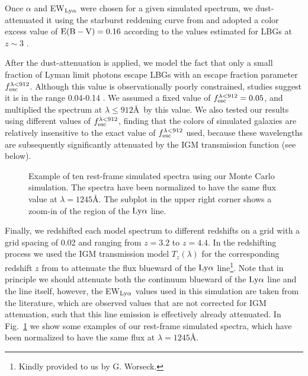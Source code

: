 \documentclass[iop, revtex4]{emulateapj}
\begin{document}
Once $\alpha$ and EW$_{\rm Ly\alpha}$ were chosen for a given
simulated spectrum, we dust-attenuated it using the starburst
reddening curve from \citet{Calzetti00} and adopted a color excess
value of $\rm E(B-V)=0.16$ according to the values estimated for LBGs
at $z\sim3$ \citep{Shapley03}.

After the dust-attenuation is applied, we model the fact that only a
small fraction of Lyman limit photons escape LBGs with an escape
fraction parameter $f_{\rm esc}^{\lambda<912}$. Although this value is
observationally poorly constrained, studies suggest it is in the range
0.04-0.14 \citep{Fernandez03, Shapley06, Ouchi04a}. We assumed a fixed
value of $f_{\rm esc}^{\lambda<912} = 0.05$, and multiplied the
spectrum at $\lambda\leq 912$\AA\, by this value. We also tested our
results using different values of $f_{\rm esc}^{\lambda<912}$, finding
that the colors of simulated galaxies are relatively insensitive to
the exact value of $f_{\rm esc}^{\lambda<912}$ used, because these wavelengths
are subsequently significantly attenuated by the IGM transmission
function (see below).

\begin{figure}
\caption{Example of ten rest-frame simulated spectra using our Monte Carlo simulation. The spectra have been normalized to have the same flux value at $\lambda=1245$\AA. The subplot in the upper right corner shows a zoom-in of the region of the ${\rm Ly\alpha}$ line.\\} 
\label{fig:simulated_spec}
\end{figure}

Finally, we redshifted 
each model spectrum to different redshifts on a grid with a grid spacing
of 0.02 and ranging from $z=3.2$ to $z=4.4$. In the redshifting process we used the
IGM transmission model $T_{z}(\lambda)$ for the corresponding redshift
$z$ from \citet{Worseck11} to attenuate the flux blueward of
the ${\rm Ly\alpha}$ line\footnote{Kindly provided to us by G. Worseck.}. Note that in
principle we should attenuate both the
continuum blueward of the ${\rm Ly\alpha}$ line and the line itself, however, the
EW$_{\rm Ly\alpha}$ values used in this simulation are taken from the
literature, which are observed values that are
not corrected for IGM attenuation, such that this line emission is effectively
already attenuated. In Fig.~\ref{fig:simulated_spec} we show some
examples of our rest-frame simulated spectra, which have been
normalized to have the same flux at $\lambda=1245$\AA.
\end{document}
